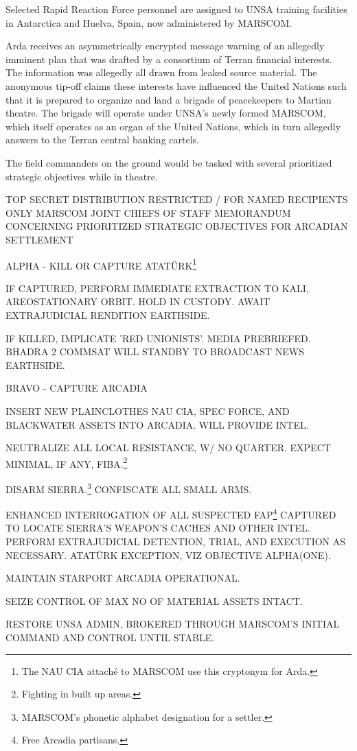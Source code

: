 Selected Rapid Reaction Force personnel are assigned to UNSA training facilities in Antarctica and Huelva, Spain, now administered by MARSCOM.
\StopTimelineDate

Arda receives an asymmetrically encrypted message warning of an allegedly imminent plan that was drafted by a consortium of Terran financial interests. The information was allegedly all drawn from leaked source material. The anonymous tip-off claims these interests have influenced the United Nations such that it is prepared to organize and land a brigade of peacekeepers to Martian theatre. The brigade will operate under UNSA's newly formed MARSCOM, which itself operates as an organ of the United Nations, which in turn allegedly answers to the Terran central banking cartels. 

The field commanders on the ground would be tasked with several prioritized strategic objectives while in theatre. 

\startTimelineCorrespondenceDocument
TOP SECRET
DISTRIBUTION RESTRICTED / FOR NAMED RECIPIENTS ONLY
MARSCOM JOINT CHIEFS OF STAFF
{ MEMORANDUM CONCERNING PRIORITIZED STRATEGIC OBJECTIVES FOR ARCADIAN SETTLEMENT}
\startitemize[4]
\item { ALPHA} - KILL OR CAPTURE ATATÜRK\footnote{The NAU CIA attaché to MARSCOM use this cryptonym for Arda.}

    \startitemize[n]
    \item IF CAPTURED, PERFORM IMMEDIATE EXTRACTION TO KALI, AREOSTATIONARY ORBIT. HOLD IN CUSTODY. AWAIT EXTRAJUDICIAL RENDITION EARTHSIDE.
    \item IF KILLED, IMPLICATE 'RED UNIONISTS'. MEDIA PREBRIEFED. BHADRA 2 COMMSAT WILL STANDBY TO BROADCAST NEWS EARTHSIDE.
    \stopitemize

\item { BRAVO} - CAPTURE ARCADIA
    \startitemize[n]
    \item INSERT NEW PLAINCLOTHES NAU CIA, SPEC FORCE, AND BLACKWATER ASSETS INTO ARCADIA. WILL PROVIDE INTEL.
    \item NEUTRALIZE ALL LOCAL RESISTANCE, W/ NO QUARTER. EXPECT MINIMAL, IF ANY, FIBA.\footnote{Fighting in built up areas.}
    \item DISARM SIERRA.\footnote{MARSCOM's phonetic alphabet designation for a settler.} CONFISCATE ALL SMALL ARMS.
    \item ENHANCED INTERROGATION OF ALL SUSPECTED FAP\footnote{Free Arcadia partisans.} CAPTURED TO LOCATE SIERRA'S WEAPON'S CACHES AND OTHER INTEL. PERFORM EXTRAJUDICIAL DETENTION, TRIAL, AND EXECUTION AS NECESSARY. ATATÜRK EXCEPTION, VIZ OBJECTIVE ALPHA(ONE).
    \item MAINTAIN STARPORT ARCADIA OPERATIONAL.
    \item SEIZE CONTROL OF MAX NO OF MATERIAL ASSETS INTACT.
    \item RESTORE UNSA ADMIN, BROKERED THROUGH MARSCOM'S INITIAL COMMAND AND CONTROL UNTIL STABLE.
    \stopitemize

